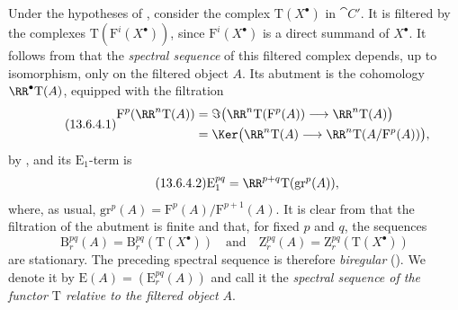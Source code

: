 \begin{env}[13.6.4]
\label{0.13.6.4}
Under the hypotheses of , consider the complex
$\mathrm{T}(X^\bullet)$ in $\cat{C}'$.
It is filtered by the complexes
$\mathrm{T}(\mathrm{F}^i(X^\bullet))$, since
$\mathrm{F}^i(X^\bullet)$ is a direct summand of $X^\bullet$.
It follows from  that the \emph{spectral sequence} of
this filtered complex depends, up to isomorphism, only on the
filtered object $A$.
Its abutment is the cohomology $\RR^\bullet\mathrm{T}(A)$, equipped
with the filtration
\begin{equation}
\label{0.13.6.4.1}
\tag{13.6.4.1}
  \begin{split}
  \mathrm{F}^p(\RR^n\mathrm{T}(A))
  &=
  \Im\bigl(
    \RR^n\mathrm{T}(\mathrm{F}^p(A))
    \longrightarrow
    \RR^n\mathrm{T}(A)
  \bigr)
  \\
  &=
  \Ker\bigl(
    \RR^n\mathrm{T}(A)
    \longrightarrow
    \RR^n\mathrm{T}(A/\mathrm{F}^p(A))
  \bigr),
  \end{split}
\end{equation}
by , and its $\mathrm{E}_1$-term is
\begin{equation}
\label{0.13.6.4.2}
\tag{13.6.4.2}
  \mathrm{E}_1^{pq}
  =
  \RR^{p+q}\mathrm{T}(\mathrm{gr}^p(A)),
\end{equation}
where, as usual,
$\mathrm{gr}^p(A)=\mathrm{F}^p(A)/\mathrm{F}^{p+1}(A)$.
It is clear from  that the filtration of the abutment
is finite and that, for fixed $p$ and $q$, the sequences
\[
  \mathrm{B}_r^{pq}(A)
  =
  \mathrm{B}_r^{pq}(\mathrm{T}(X^\bullet))
  \quad\text{and}\quad
  \mathrm{Z}_r^{pq}(A)
  =
  \mathrm{Z}_r^{pq}(\mathrm{T}(X^\bullet))
\]
are stationary.
The preceding spectral sequence is therefore \emph{biregular}
().
We denote it by
$\mathrm{E}(A)=(\mathrm{E}_r^{pq}(A))$ and call it the
\emph{spectral sequence of the functor $\mathrm{T}$ relative to the
filtered object $A$}.
\end{env}

